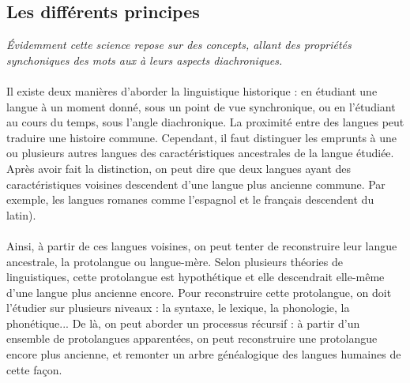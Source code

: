 \documentclass[12pt, french, twoside]{report}
\begin{document}
\subsection{Les différents principes}
\textit{Évidemment cette science repose sur des concepts, allant des propriétés synchoniques des mots aux à leurs aspects diachroniques.}
\\ \\ 
\indent Il existe deux manières d'aborder la linguistique historique : en étudiant une langue à un moment donné, sous un point de vue synchronique, ou en l'étudiant au cours du temps, sous l'angle diachronique. La proximité entre des langues peut traduire une histoire commune. Cependant, il faut distinguer les emprunts à une ou plusieurs autres langues des caractéristiques ancestrales de la langue étudiée. Après avoir fait la distinction, on peut dire que deux langues ayant des caractéristiques voisines descendent d'une langue plus ancienne commune. Par exemple, les langues romanes comme l'espagnol et le français descendent du latin). \\ \\ 
\indent Ainsi, à partir de ces langues voisines, on peut tenter de reconstruire leur langue ancestrale, la protolangue ou langue-mère. Selon plusieurs théories de linguistiques, cette protolangue est hypothétique et elle descendrait elle-même d'une langue plus ancienne encore.
Pour reconstruire cette protolangue, on doit l'étudier sur plusieurs niveaux : la syntaxe, le lexique, la phonologie, la phonétique... De là, on peut aborder un processus récursif : à partir d'un ensemble de protolangues apparentées, on peut reconstruire une protolangue encore plus ancienne, et remonter un arbre généalogique des langues humaines de cette façon.
\end{document}
